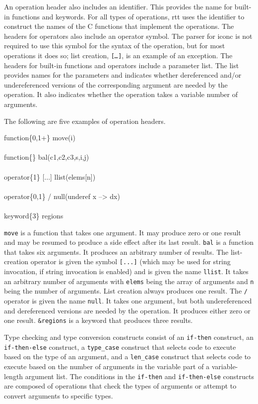 An operation header also includes an identifier. This provides the
name for built-in functions and keywords. For all types of operations,
rtt uses the identifier to construct the names of the C functions that
implement the operations.  The headers for operators also include an
operator symbol. The parser for iconc is not required to use this
symbol for the syntax of the operation, but for most operations it
does so; list creation, \texttt{[\textit{\ldots}]}, is an example of an
exception. The headers for built-in functions and operators include a
parameter list. The list provides names for the parameters and
indicates whether dereferenced and/or undereferenced versions of the
corresponding argument are needed by the operation. It also indicates
whether the operation takes a variable number of arguments.


The following are five examples of operation headers. 

\goodbreak
\begin{iconcode}
\>function\{0,1+\} move(i)\\\\
\>function\{\} bal(c1,c2,c3,s,i,j)\\\\
\>operator\{1\} [...] llist(elems[n])\\\\
\>operator\{0,1\} / null(underef x --> dx)\\\\
\>keyword\{3\} regions
\end{iconcode}

\noindent
\texttt{move} is a function that takes one argument. It may produce
zero or one result and may be resumed to produce a side effect after
its last result. \texttt{bal} is a function that takes six arguments.
It produces an arbitrary number of results.  The list-creation operator
is given the symbol \texttt{[...]} (which may be used for string
invocation, if string invocation is enabled) and is given the name
\texttt{llist}. It takes an arbitrary number of arguments with
\texttt{elems} being the array of arguments and \texttt{n} being the
number of arguments. List creation always produces one result. The
\texttt{/} operator is given the name \texttt{null}.  It takes one
argument, but both undereferenced and dereferenced versions are needed
by the operation. It produces either zero or one result.
\texttt{\&regions} is a keyword that produces three results.

Type checking and type conversion constructs consist of an
\texttt{if-then} construct, an \texttt{if-then-else} construct, a
\texttt{type\_case} construct that selects code to execute based on
the type of an argument, and a \texttt{len\_case} construct that
selects code to execute based on the number of arguments in the
variable part of a variable-length argument list. The conditions in
the \texttt{if-then} and \texttt{if-then-else} constructs are composed
of operations that check the types of arguments or attempt to convert
arguments to specific types.

